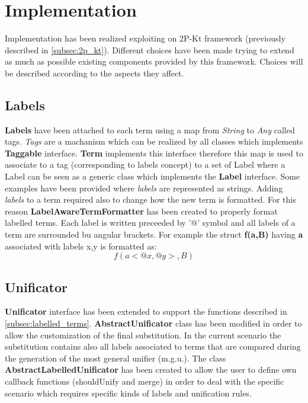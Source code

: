 \section{Implementation}\label{sec:implementation_labelled}

Implementation has been realized exploiting on 2P-Kt framework (previously described in \ref{subsec:2p_kt}).
Different choices have been made trying to extend as much as possible existing components provided by this framework.
Choices will be described according to the aspects they affect.

\subsection{Labels}\label{subsec:labels}

\textbf{Labels} have been attached to each term using a map from \textit{String} to \textit{Any} called tags. \textit{Tags}
are a machanism which can be realized by all classes which implements \textbf{Taggable} interface. \textbf{Term} implements
this interface therefore this map is used to associate to a tag (corresponding to labels concept) to a set of Label where a Label can be seen as a generic class
which implements the \textbf{Label} interface. Some examples have been provided where \textit{labels} are represented as strings.\newline
Adding \textit{labels} to a term required also to change how the new term is formatted. For this reason \textbf{LabelAwareTermFormatter} has been created
to properly format labelled terms. Each label is written preceeded by '@' symbol and all labels of a term are surrounded
bu angular brackets.\newline
For example the struct \textbf{f(a,B)} having \textbf{a} associated with labels {x,y} is formatted as:
\[f(a<@x,@y>,B)\]

\subsection{Unificator}\label{subsec:unificator}
\textbf{Unificator} interface has been extended to support the functions described in \ref{subsec:labelled_terms}.
\textbf{AbstractUnificator} class has been modified in order to allow the customization of the final substitution. In the current scenario
the substitution contains also all labels associated to terms that are compared during the generation of the most general unifier (m.g.u.).\newline
The class \textbf{AbstractLabelledUnificator} has been created to allow the user to define own callback functions (shouldUnify and merge) in order
to deal with the specific scenario which requires specific kinds of labels and unification rules.

